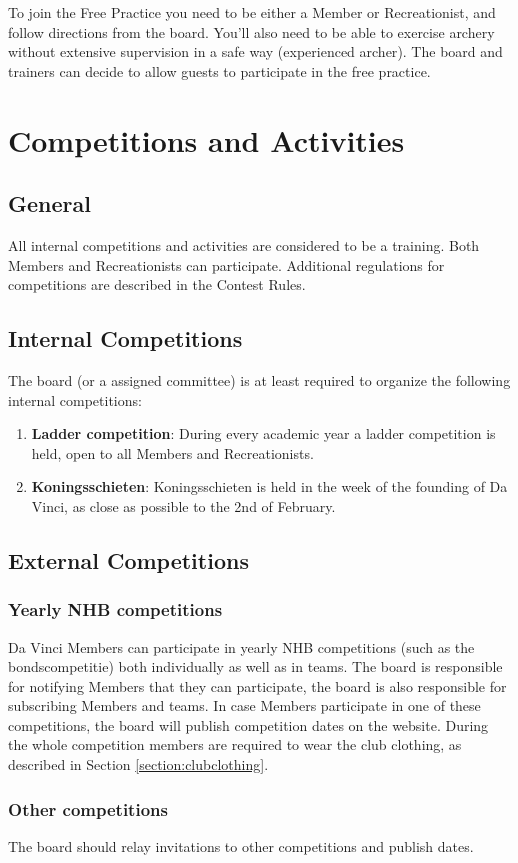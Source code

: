 \documentclass[a4paper]{article}
\newcommand{\Awr}{Contest Rules} %
\begin{document}
To join the Free Practice you need to be either a { Member} or { Recreationist}, and follow directions from the board. You'll also need to be able to exercise archery without extensive supervision in a safe way ({ experienced} { archer}). The board and trainers can decide to allow { guests} to participate in the free practice.

\section{Competitions and Activities}
\subsection{General}
All internal competitions and activities are considered to be a training. Both { Members} and { Recreationists} can participate. Additional regulations for competitions are described in the { \Awr}.

\subsection{Internal Competitions}
The board (or a assigned committee) is at least required to organize the following internal competitions: \\
\begin{enumerate}
\item \textbf{Ladder competition}: During every academic year a ladder competition is held, open to all { Members} and { Recreationists}.
\item \textbf{Koningsschieten}: Koningsschieten is held in the week of the founding of Da Vinci, as close as possible to the 2nd of February.
\end{enumerate}

\subsection{External Competitions}
\subsubsection{Yearly NHB competitions}
Da Vinci { Members} can participate in yearly { NHB} competitions (such as the bondscompetitie) both individually as well as in teams. The board is responsible for notifying { Members} that they can participate, the board is also responsible for subscribing { Members} and teams. In case { Members} participate in one of these competitions, the board will publish competition dates on the website. During the whole competition members are required to wear the club clothing, as described in Section \ref{section:clubclothing}.

\subsubsection{Other competitions}
The board should relay invitations to other competitions and publish dates.
\end{document}
